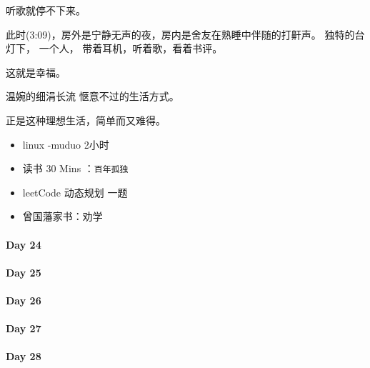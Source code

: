 \documentclass[UTF8,a4paper,8pt]{ctexart}
\begin{document}
		听歌就停不下来。
		
		此时(3:09)，房外是宁静无声的夜，房内是舍友在熟睡中伴随的打鼾声。
		独特的台灯下，
		一个人，
		带着耳机，听着歌，看着书评。
		
		这就是幸福。
		
		温婉的细涓长流
		惬意不过的生活方式。
		
		正是这种理想生活，简单而又难得。
		\begin{itemize}[itemindent = 1em]
			\renewcommand\labelitemi{\makebox[0pt][l]{$\square$}\raisebox{.15ex}{\hspace{0.1em}$\checkmark$}}		
			\item   linux -muduo 2小时

			\renewcommand\labelitemi{\makebox[0pt][l]{$\square$}\hspace{1em}}
			\item   读书  30 Mins	：\verb|百年孤独|
			\item   leetCode 动态规划 一题
			
			
			\item  曾国藩家书：劝学
		\end{itemize}
	\paragraph{Day 24      \quad     }
	\paragraph{Day 25      \quad     }
	\paragraph{Day 26      \quad     }
	\paragraph{Day 27      \quad     }
	\paragraph{Day 28      \quad     }
\end{document}
